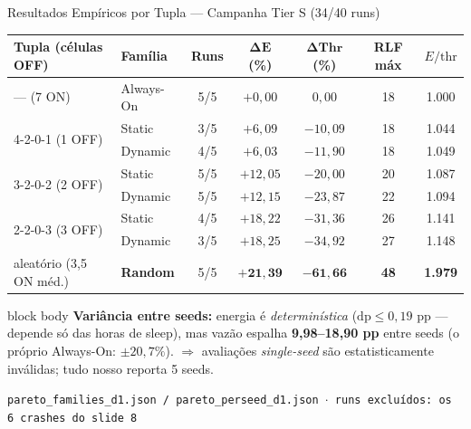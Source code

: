 \documentclass[aspectratio=169,10pt,xcolor={dvipsnames,table}]{beamer}
\newcommand{\datapath}[1]{{\scriptsize\color{darkgray}\texttt{#1}}}
\begin{document}
\begin{frame}{Resultados Emp\'iricos por Tupla --- Campanha Tier S (34/40 runs)}
  \begin{table}
    \centering\scriptsize
    \setlength{\tabcolsep}{4.5pt}
    \renewcommand{\arraystretch}{1.1}
    \begin{tabular}{@{}llccccc@{}}
      \toprule
      \textbf{Tupla} (células OFF) & \textbf{Família} & \textbf{Runs} &
      $\boldsymbol{\Delta E}$ \textbf{(\%)} & $\boldsymbol{\Delta\text{Thr}}$ \textbf{(\%)} &
      \textbf{RLF máx} & \textbf{$E/\text{thr}$} \\
      \midrule
      --- (7 ON)              & Always-On   & 5/5 & $+0{,}00$  & $0{,}00$        & 18 & 1.000 \\
      \multirow{2}{*}{4-2-0-1 (1 OFF)}  & Static  & 3/5 & $+6{,}09$ & $-10{,}09$ & 18 & 1.044 \\
                                        & Dynamic & 4/5 & $+6{,}03$ & $-11{,}90$ & 18 & 1.049 \\
      \multirow{2}{*}{3-2-0-2 (2 OFF)}  & Static  & 5/5 & $+12{,}05$ & $-20{,}00$ & 20 & 1.087 \\
                                        & Dynamic & 5/5 & $+12{,}15$ & $-23{,}87$ & 22 & 1.094 \\
      \multirow{2}{*}{2-2-0-3 (3 OFF)}  & Static  & 4/5 & $+18{,}22$ & $-31{,}36$ & 26 & 1.141 \\
                                        & Dynamic & 3/5 & $+18{,}25$ & $-34{,}92$ & 27 & 1.148 \\
      aleatório (3,5 ON méd.) & \textbf{Random} & 5/5 &
        $\mathbf{+21{,}39}$ & $\mathbf{-61{,}66}$ & \textbf{48} & \textbf{1.979} \\
      \bottomrule
    \end{tabular}
  \end{table}
  \vspace{-1mm}
  \begin{beamercolorbox}[wd=\textwidth,sep=2pt]{block body}
    \small\textbf{Variância entre seeds:} energia é \emph{determinística}
    ($\mathrm{dp} \le 0{,}19$ pp --- depende só das horas de sleep), mas vazão
    espalha \textbf{9,98--18,90 pp} entre seeds (o próprio Always-On:
    $\pm 20{,}7\%$). $\Rightarrow$ avaliações \emph{single-seed} são
    estatisticamente inválidas; tudo nosso reporta 5 seeds.
  \end{beamercolorbox}
  \datapath{pareto\_families\_d1.json / pareto\_perseed\_d1.json $\cdot$ runs excluídos: os 6 crashes do slide 8}
\end{frame}
\end{document}
